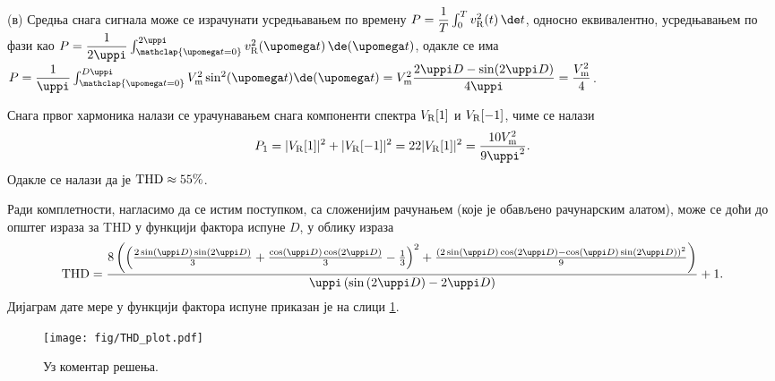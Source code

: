 (в) Средња снага сигнала може се израчунати усредњавањем по времену
$P = \dfrac{1}{T} \int_0^T v_{\rm R}^2(t) \, \de t$, односно еквивалентно, 
усредњавањем по фази као 
$P = \dfrac{1}{2\uppi} \int_{\mathclap{\upomega t = 0}}^{2\uppi} v_{\rm R}^2(\upomega t) \, \de(\upomega t)$, одакле се 
има 
$P = \dfrac{1}{\uppi} \int_{\mathclap{\upomega t = 0}}^{D\uppi} V_{\rm m}^2 \sin^2(\upomega t) \de (\upomega t) 
   = V_{\rm m}^2 \dfrac{2\uppi D - \sin(2\uppi D)}{4\uppi} = \dfrac{V_{\rm m}^2}{4}$.

Снага првог хармоника налази се урачунавањем снага компоненти спектра $V_{\rm R}[1]$ и $V_{\rm R}[-1]$, чиме се налази
\begin{equation}
    P_1 = |V_{\rm R}[1]|^2 + |V_{\rm R}[-1]|^2 = 2 2 |V_{\rm R}[1]|^2 
    = \dfrac{10 V_{\rm m}^2}{9\uppi^2}.
\end{equation}
Одакле се налази да је $\rm THD \approx 55\%$.

Ради комплетности, нагласимо да се истим поступком, са сложенијим рачунањем (које је обављено рачунарским алатом), 
може се доћи до општег израза за THD у функцији фактора испуне $D$, у облику израза
\small
\begin{equation}
    {\rm THD} = 
    {{8\left(\left({{2\sin (\uppi D)\sin \left(2\uppi
 D\right)}\over{3}}+{{\cos (\uppi D)\cos \left(2\uppi D
 \right)}\over{3}}-{{1}\over{3}}\right)^2+{{\left(2\sin \left(\uppi
 D\right)\cos \left(2\uppi D\right)-\cos (\uppi D)
 \sin \left(2\uppi D\right)\right)^2}\over{9}}\right)}\over{\uppi
 \left(\sin \left(2\uppi D\right)-2\uppi D\right)}}+1.
\end{equation}\normalsize
Дијаграм дате мере у функцији фактора испуне приказан је на слици \ref{\ID.comm}.

\begin{figure}
    \centering
    \texttt{[image: fig/THD\_plot.pdf]}
    \caption{Уз коментар решења.}
    \label{\ID.comm}
\end{figure}